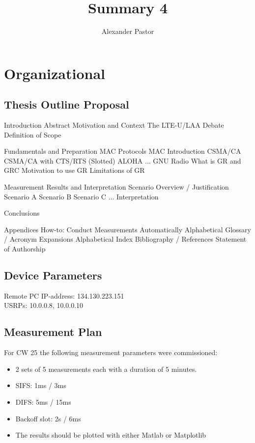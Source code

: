 \documentclass{article}
\begin{document}
	
\title{Summary 4}
\author{Alexander Pastor}
\maketitle
\tableofcontents
\newpage

\section{Organizational}

\subsection{Thesis Outline Proposal}

\begin{outline}[enumerate]
	\1 Introduction
		\2 Abstract
		\2 Motivation and Context
			\3 The LTE-U/LAA Debate 
			\3 Definition of Scope
		
	\1 Fundamentals and Preparation
		\2 MAC Protocols
			\3 MAC Introduction
		 	\3 CSMA/CA
		 	\3 CSMA/CA with CTS/RTS
		 	\3 (Slotted) ALOHA
		 	\3 ...
		\2 GNU Radio 
			\3 What is GR and GRC
			\3 Motivation to use GR
			\3 Limitations of GR
	
	\1 Measurement Results and Interpretation
		\2 Scenario Overview / Justification
		\2 Scenario A
		\2 Scenario B
		\2 Scenario C
		\2 ...
		\2 Interpretation
		
	\1 Conclusions
	
	\1 Appendices
		\2 How-to: Conduct Measurements Automatically
		\2 Alphabetical Glossary / Acronym Expansions
		\2 Alphabetical Index
		\2 Bibliography / References
		\2 Statement of Authorship
\end{outline}

\subsection{Device Parameters}

Remote PC IP-address: 134.130.223.151 \\
USRPs: 10.0.0.8, 10.0.0.10

\subsection{Measurement Plan}

For CW 25 the following measurement parameters were commissioned:

\begin{itemize}
	\item 2 sets of 5 measurements each with a duration of 5 minutes.
	\item SIFS: 1ms / 3ms 
	\item DIFS: 5ms  / 15ms 
	\item Backoff slot: 2s / 6ms
	\item The results should be plotted with either Matlab or Matplotlib
\end{itemize}
\end{document}

